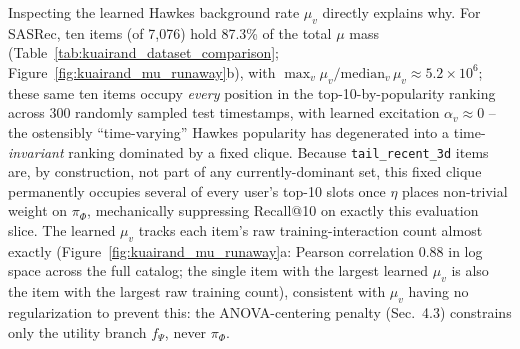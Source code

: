 Inspecting the learned Hawkes background rate $\mu_v$ directly explains why. For SASRec,
ten items (of 7{,}076) hold 87.3\% of the total $\mu$ mass
(Table~\ref{tab:kuairand_dataset_comparison}; Figure~\ref{fig:kuairand_mu_runaway}b), with
$\max_v \mu_v / \mathrm{median}_v\, \mu_v \approx 5.2\times 10^6$; these same ten items
occupy \emph{every} position in the top-10-by-popularity ranking across 300 randomly
sampled test timestamps, with learned excitation $\alpha_v \approx 0$ -- the ostensibly
``time-varying'' Hawkes popularity has degenerated into a time-\emph{invariant} ranking
dominated by a fixed clique. Because \texttt{tail\_recent\_3d} items are, by construction,
not part of any currently-dominant set, this fixed clique permanently occupies several of
every user's top-10 slots once $\eta$ places non-trivial weight on $\pi_\Phi$,
mechanically suppressing Recall@10 on exactly this evaluation slice. The learned $\mu_v$
tracks each item's raw training-interaction count almost exactly
(Figure~\ref{fig:kuairand_mu_runaway}a: Pearson correlation $0.88$ in log space across the
full catalog; the single item with the largest learned $\mu_v$ is also the item with the
largest raw training count), consistent with $\mu_v$ having no regularization to prevent
this: the ANOVA-centering penalty (Sec.~4.3) constrains only the utility branch
$f_\Psi$, never $\pi_\Phi$.

